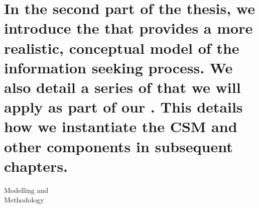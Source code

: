 
\part[Modelling and Methodology]{In the second part of the thesis, we introduce the  that provides a more realistic, conceptual model of the information seeking process. We also detail a series of  that we will apply as part of our . This details how we instantiate the CSM and other components in subsequent chapters.}{Modelling and\\Methodology}\label{part:stopping}